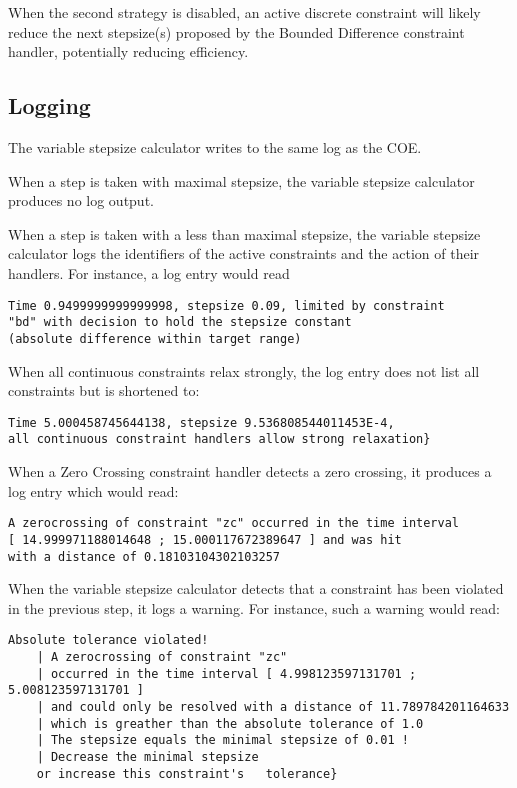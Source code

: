 \noindent When the second strategy is disabled, an active discrete constraint will likely reduce the next stepsize(s) proposed by the Bounded Difference constraint handler, potentially reducing efficiency.

\subsection{Logging}

The variable stepsize calculator writes to the same log as the COE.

\noindent When a step is taken with maximal stepsize, the variable stepsize calculator produces no log output.

\noindent When a step is taken with a less than maximal stepsize, the variable stepsize calculator logs the identifiers of the active constraints and the action of their handlers. For instance, a log entry would read

\begin{lstlisting}[basicstyle=\footnotesize\ttfamily]
Time 0.9499999999999998, stepsize 0.09, limited by constraint
"bd" with decision to hold the stepsize constant
(absolute difference within target range)
\end{lstlisting}

\noindent When all continuous constraints relax strongly, the log entry does not list all constraints but is shortened to:

\begin{lstlisting}[basicstyle=\footnotesize\ttfamily]
Time 5.000458745644138, stepsize 9.536808544011453E-4,
all continuous constraint handlers allow strong relaxation}
\end{lstlisting}

\noindent When a Zero Crossing constraint handler detects a zero crossing, it produces a log entry which would read:

\begin{lstlisting}[basicstyle=\footnotesize\ttfamily]
A zerocrossing of constraint "zc" occurred in the time interval
[ 14.999971188014648 ; 15.000117672389647 ] and was hit
with a distance of 0.18103104302103257
\end{lstlisting} 
\noindent When the variable stepsize calculator detects that a constraint has been violated in the previous step, it logs a warning. For instance, such a warning would read:

\begin{lstlisting}[basicstyle=\footnotesize\ttfamily]
Absolute tolerance violated!
	| A zerocrossing of constraint "zc"
	| occurred in the time interval [ 4.998123597131701 ; 5.008123597131701 ]
	| and could only be resolved with a distance of 11.789784201164633
	| which is greather than the absolute tolerance of 1.0
	| The stepsize equals the minimal stepsize of 0.01 !
	| Decrease the minimal stepsize
	or increase this constraint's	tolerance}
\end{lstlisting}
